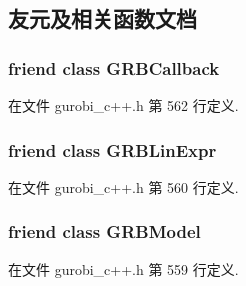 \subsection{友元及相关函数文档}
\subsubsection[{\texorpdfstring{G\+R\+B\+Callback}{GRBCallback}}]{\setlength{\rightskip}{0pt plus 5cm}friend class {\bf G\+R\+B\+Callback}\hspace{0.3cm}{\ttfamily [friend]}}\hypertarget{classGRBVar_acfba07303dba169ec36e15619375c9b5}{}\label{classGRBVar_acfba07303dba169ec36e15619375c9b5}


在文件 gurobi\+\_\+c++.\+h 第 562 行定义.

\subsubsection[{\texorpdfstring{G\+R\+B\+Lin\+Expr}{GRBLinExpr}}]{\setlength{\rightskip}{0pt plus 5cm}friend class {\bf G\+R\+B\+Lin\+Expr}\hspace{0.3cm}{\ttfamily [friend]}}\hypertarget{classGRBVar_a0bd37572a3d07daa212f303433d658dc}{}\label{classGRBVar_a0bd37572a3d07daa212f303433d658dc}


在文件 gurobi\+\_\+c++.\+h 第 560 行定义.

\subsubsection[{\texorpdfstring{G\+R\+B\+Model}{GRBModel}}]{\setlength{\rightskip}{0pt plus 5cm}friend class {\bf G\+R\+B\+Model}\hspace{0.3cm}{\ttfamily [friend]}}\hypertarget{classGRBVar_a43690ac42cca6dade14d7fde97306d59}{}\label{classGRBVar_a43690ac42cca6dade14d7fde97306d59}


在文件 gurobi\+\_\+c++.\+h 第 559 行定义.


